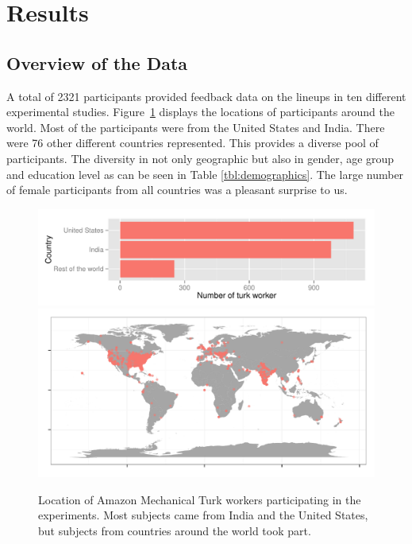 \documentclass[10pt]{article}\usepackage[]{graphicx}\usepackage[]{color}
\begin{document}
\section{Results}\label{sec:result_socio}

\subsection{Overview of the Data} A total of 2321 participants provided feedback data on the lineups in ten different experimental studies. Figure~\ref{fig:turker_location} displays the locations of participants around the world.  Most of the participants were from the United States and India. There were 76 other different countries represented. This provides a diverse pool of participants. The diversity in not only  geographic but also in gender, age group and education level as can be seen in Table \ref{tbl:demographics}. %
The large number of female participants from all countries was a pleasant surprise to us.

\begin{figure}[htbp] 
   \centering
   \includegraphics[width=4.5in]{turker_country.pdf} 
   \includegraphics[width=4.5in]{turker_location.pdf}    
   \caption{Location of  Amazon Mechanical Turk workers participating in the experiments. Most subjects came from India and the United States, but subjects  from countries around the world took part.}
   \label{fig:turker_location}
\end{figure}
\end{document}

